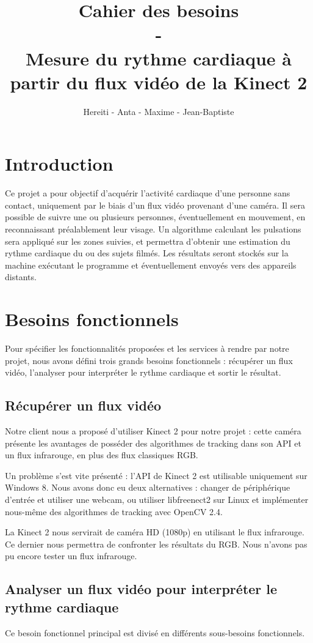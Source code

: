 \documentclass[12pt,a4paper]{article}
\title{Cahier des besoins \\-\\ Mesure du rythme cardiaque à partir du flux vidéo de la Kinect 2}
\author{Hereiti \bsc{Hatitio} - Anta \bsc{Mbaye} - Maxime \bsc{Vincent} - Jean-Baptiste \bsc{Rey}}
\begin{document}
\maketitle
\newpage
\tableofcontents
\newpage

\section*{Introduction}

Ce projet a pour objectif d'acquérir l'activité cardiaque d'une personne sans contact, uniquement par le biais d'un flux vidéo provenant d'une caméra.
Il sera possible de suivre une ou plusieurs personnes, éventuellement en mouvement, en reconnaissant préalablement leur visage. Un algorithme calculant les pulsations sera appliqué sur les zones suivies, et permettra d'obtenir une estimation du rythme cardiaque du ou des sujets filmés. Les résultats seront stockés sur la machine exécutant le programme et éventuellement envoyés vers des appareils distants.  

\section{Besoins fonctionnels}
Pour spécifier les fonctionnalités proposées et les services à rendre par notre projet, nous avons défini trois grands besoins fonctionnels : récupérer un flux vidéo, l'analyser pour interpréter le rythme cardiaque et sortir le résultat.

\subsection{Récupérer un flux vidéo}
Notre client nous a proposé d'utiliser Kinect 2 pour notre projet : cette caméra présente les avantages de posséder des algorithmes de tracking dans son API et un flux infrarouge, en plus des flux classiques RGB.

Un problème s'est vite présenté : l'API de Kinect 2 est utilisable uniquement sur Windows 8. Nous avons donc eu deux alternatives : changer de périphérique d'entrée et utiliser une webcam, ou utiliser libfreenect2 sur Linux et implémenter nous-même des algorithmes de tracking avec OpenCV 2.4.

La Kinect 2 nous servirait de caméra HD (1080p) en utilisant le flux infrarouge. Ce dernier nous permettra de confronter les résultats du RGB. Nous n'avons pas pu encore tester un flux infrarouge.

\subsection{Analyser un flux vidéo pour interpréter le rythme cardiaque}
Ce besoin fonctionnel principal est divisé en différents sous-besoins fonctionnels.
\end{document}
